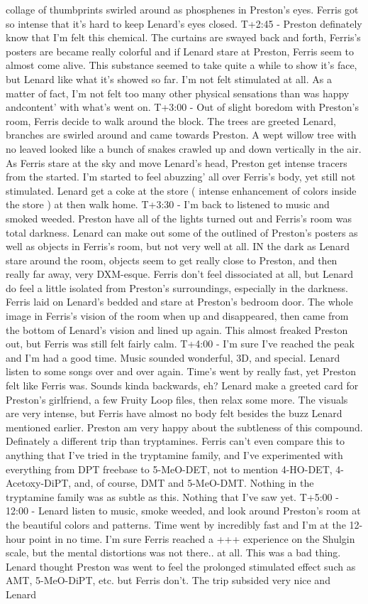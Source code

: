 \documentclass[12pt]{book}
\begin{document}
collage of thumbprints swirled around as phosphenes in Preston's eyes. Ferris got so intense that it's hard to keep Lenard's eyes closed. T+2:45 - Preston definately know that I'm felt this chemical. The curtains are swayed back and forth, Ferris's posters are became really colorful and if Lenard stare at Preston, Ferris seem to almost come alive. This substance seemed to take quite a while to show it's face, but Lenard like what it's showed so far. I'm not felt stimulated at all. As a matter of fact, I'm not felt too many other physical sensations than was happy andcontent' with what's went on. T+3:00 - Out of slight boredom with Preston's room, Ferris decide to walk around the block. The trees are greeted Lenard, branches are swirled around and came towards Preston. A wept willow tree with no leaved looked like a bunch of snakes crawled up and down vertically in the air. As Ferris stare at the sky and move Lenard's head, Preston get intense tracers from the started. I'm started to feel abuzzing' all over Ferris's body, yet still not stimulated. Lenard get a coke at the store ( intense enhancement of colors inside the store ) at then walk home. T+3:30 - I'm back to listened to music and smoked weeded. Preston have all of the lights turned out and Ferris's room was total darkness. Lenard can make out some of the outlined of Preston's posters as well as objects in Ferris's room, but not very well at all. IN the dark as Lenard stare around the room, objects seem to get really close to Preston, and then really far away, very DXM-esque. Ferris don't feel dissociated at all, but Lenard do feel a little isolated from Preston's surroundings, especially in the darkness. Ferris laid on Lenard's bedded and stare at Preston's bedroom door. The whole image in Ferris's vision of the room when up and disappeared, then came from the bottom of Lenard's vision and lined up again. This almost freaked Preston out, but Ferris was still felt fairly calm. T+4:00 - I'm sure I've reached the peak and I'm had a good time. Music sounded wonderful, 3D, and special. Lenard listen to some songs over and over again. Time's went by really fast, yet Preston felt like Ferris was. Sounds kinda backwards, eh? Lenard make a greeted card for Preston's girlfriend, a few Fruity Loop files, then relax some more. The visuals are very intense, but Ferris have almost no body felt besides the buzz Lenard mentioned earlier. Preston am very happy about the subtleness of this compound. Definately a different trip than tryptamines. Ferris can't even compare this to anything that I've tried in the tryptamine family, and I've experimented with everything from DPT freebase to 5-MeO-DET, not to mention 4-HO-DET, 4-Acetoxy-DiPT, and, of course, DMT and 5-MeO-DMT. Nothing in the tryptamine family was as subtle as this. Nothing that I've saw yet. T+5:00 - 12:00 - Lenard listen to music, smoke weeded, and look around Preston's room at the beautiful colors and patterns. Time went by incredibly fast and I'm at the 12-hour point in no time. I'm sure Ferris reached a +++ experience on the Shulgin scale, but the mental distortions was not there.. at all. This was a bad thing. Lenard thought Preston was went to feel the prolonged stimulated effect such as AMT, 5-MeO-DiPT, etc. but Ferris don't. The trip subsided very nice and Lenard 
\end{document}
